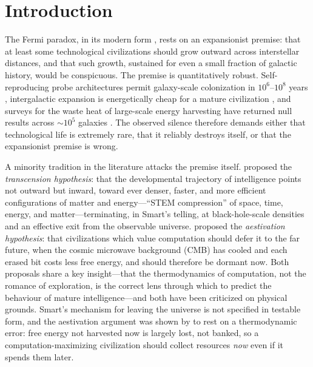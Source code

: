 \documentclass[11pt]{article}
\begin{document}
\begin{abstract}
explicitly which forthcoming observations would discriminate between them, and which would falsify the MTH outright. The hypothesis is offered in the falsificationist tradition of the aestivation and black-hole-computing literature: a speculative but physically grounded working model whose value lies in the concrete observational program it motivates.

\medskip
\noindent\textbf{Keywords:} Fermi paradox \textbullet{} technosignatures \textbullet{} SETI \textbullet{} intermediate-mass black holes \textbullet{} Omega Centauri \textbullet{} NGC~5139 \textbullet{} Blandford--Znajek mechanism \textbullet{} Landauer limit \textbullet{} transcension \textbullet{} aestivation
\end{abstract}

\section{Introduction}\label{sec:intro}
The Fermi paradox, in its modern form \citep{hart1975,tipler1980,webb2015,cirkovic2018,forgan2019}, rests on an expansionist premise: that at least some technological civilizations should grow outward across interstellar distances, and that such growth, sustained for even a small fraction of galactic history, would be conspicuous. The premise is quantitatively robust. Self-reproducing probe architectures permit galaxy-scale colonization in $10^{6}$--$10^{8}$ years \citep{tipler1980,freitas1982}, intergalactic expansion is energetically cheap for a mature civilization \citep{armstrong2013}, and surveys for the waste heat of large-scale energy harvesting have returned null results across ${\sim}10^{5}$ galaxies \citep{wright2014,griffith2015}. The observed silence therefore demands either that technological life is extremely rare, that it reliably destroys itself, or that the expansionist premise is wrong.

A minority tradition in the literature attacks the premise itself. \citet{smart2012} proposed the \emph{transcension hypothesis}: that the developmental trajectory of intelligence points not outward but inward, toward ever denser, faster, and more efficient configurations of matter and energy---``STEM compression'' of space, time, energy, and matter---terminating, in Smart's telling, at black-hole-scale densities and an effective exit from the observable universe. \citet{sandberg2016} proposed the \emph{aestivation hypothesis}: that civilizations which value computation should defer it to the far future, when the cosmic microwave background (CMB) has cooled and each erased bit costs less free energy, and should therefore be dormant now. Both proposals share a key insight---that the thermodynamics of computation, not the romance of exploration, is the correct lens through which to predict the behaviour of mature intelligence---and both have been criticized on physical grounds. Smart's mechanism for leaving the universe is not specified in testable form, and the aestivation argument was shown by \citet{bennett2019} to rest on a thermodynamic error: free energy not harvested now is largely lost, not banked, so a computation-maximizing civilization should collect resources \emph{now} even if it spends them later.
\end{document}
